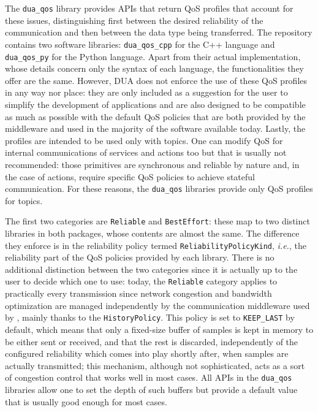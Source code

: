 The \texttt{dua\_qos} library \cite{masocco_dua_qos_nodate} provides APIs that return QoS profiles that account for these issues, distinguishing first between the desired reliability of the communication and then between the data type being transferred. The repository contains two software libraries: \texttt{dua\_qos\_cpp} for the C++ language and \texttt{dua\_qos\_py} for the Python language. Apart from their actual implementation, whose details concern only the syntax of each language, the functionalities they offer are the same. However, DUA does not enforce the use of these QoS profiles in any way nor place: they are only included as a suggestion for the user to simplify the development of \ROS applications and are also designed to be compatible as much as possible with the default QoS policies that are both provided by the \ROS middleware and used in the majority of the \ROS software available today. Lastly, the profiles are intended to be used only with topics. One can modify QoS for internal communications of services and actions too but that is usually not recommended: those primitives are synchronous and reliable by nature and, in the case of actions, require specific QoS policies to achieve stateful communication. For these reasons, the \texttt{dua\_qos} libraries provide only QoS profiles for topics.

The first two categories are \texttt{Reliable} and \texttt{BestEffort}: these map to two distinct libraries in both packages, whose contents are almost the same. The difference they enforce is in the reliability policy termed \texttt{ReliabilityPolicyKind}, \emph{i.e.}, the reliability part of the QoS policies provided by each library. There is no additional distinction between the two categories since it is actually up to the user to decide which one to use: today, the \texttt{Reliable} category applies to practically every transmission since network congestion and bandwidth optimization are managed independently by the communication middleware used by \ROS, mainly thanks to the \texttt{HistoryPolicy}. This policy is set to \texttt{KEEP\_LAST} by default, which means that only a fixed-size buffer of samples is kept in memory to be either sent or received, and that the rest is discarded, independently of the configured reliability which comes into play shortly after, when samples are actually transmitted; this mechanism, although not sophisticated, acts as a sort of congestion control that works well in most cases. All APIs in the \texttt{dua\_qos} libraries allow one to set the depth of such buffers but provide a default value that is usually good enough for most cases.

